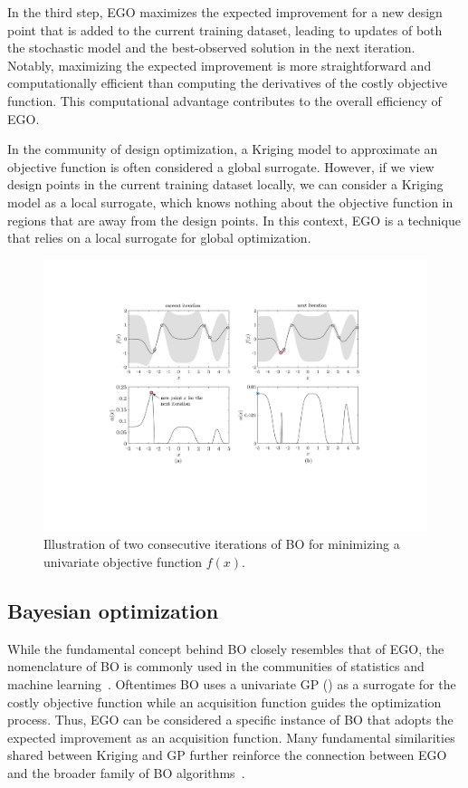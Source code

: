 \documentclass[journal ]{new-aiaa}
\begin{document}
In the third step, EGO maximizes the expected improvement for a new design point that is added to the current training dataset, leading to updates of both the stochastic model and the best-observed solution in the next iteration.
Notably, maximizing the expected improvement is more straightforward and computationally efficient than computing the derivatives of the costly objective function.
This computational advantage contributes to the overall efficiency of EGO.

In the community of design optimization, a Kriging model to approximate an objective function is often considered a global surrogate.
However, if we view design points in the current training dataset locally, we can consider a Kriging model as a local surrogate, which knows nothing about the objective function in regions that are away from the design points.
In this context, EGO is a technique that relies on a local surrogate for global optimization.  

\begin{figure}
	\centering
	\includegraphics[scale=0.82]{Fig5.pdf}
	\caption{ Illustration of two consecutive iterations of BO for minimizing a univariate objective function $f(x)$.}
	\label{Fig-5}
\end{figure}

\subsection{Bayesian optimization}\label{Sec32}

While the fundamental concept behind BO closely resembles that of EGO, the nomenclature of BO is commonly used in the communities of statistics and machine learning~\citep{Bull2011,Snoek2012,Shahriari2016,Frazier2018}.
Oftentimes BO uses a univariate GP () as a surrogate for the costly objective function while an acquisition function guides the optimization process. 
Thus, EGO can be considered a specific instance of BO that adopts the expected improvement as an acquisition function.
Many fundamental similarities shared between Kriging and GP further reinforce the connection between EGO and the broader family of BO algorithms~\citep{Christianson2023}.
\end{document}
